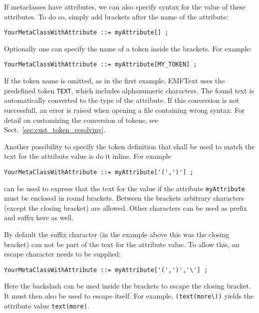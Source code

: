 If metaclasses have attributes, we can also specify syntax for the value of
these attributes. To do so, simply add brackets after the name of the attribute:

\begin{lstlisting}
YourMetaClassWithAttribute ::= myAttribute[] ;
\end{lstlisting}

Optionally one can specify the name of a token inside the brackets. For example:

\begin{lstlisting}
YourMetaClassWithAttribute ::= myAttribute[MY_TOKEN] ;
\end{lstlisting}

If the token name is omitted, as in the first example, EMFText uses the 
predefined token \texttt{TEXT}, which includes alphanumeric characters. The
found text is automatically converted to the type of the attribute. If this 
conversion is not successfull, an error is raised when opening a file containing 
wrong syntax. For detail on customizing the conversion of tokens, see
Sect.~\ref{sec:cust_token_resolving}.

Another possibility to specify the token definition that shall be used to match 
the text for the attribute value is do it inline. For example

\begin{lstlisting}
YourMetaClassWithAttribute ::= myAttribute['(',')'] ;
\end{lstlisting}

can be used to express that the text for the value if the attribute
\texttt{myAttribute} must be enclosed in round brackets. Between the brackets 
arbitrary characters (except the closing 
bracket) are allowed. Other characters can be used as prefix and suffix here as 
well.

By default the suffix character (in the example above this was the closing 
bracket) can not be part of the text for the attribute value. To allow this, 
an escape character needs to be supplied:

\begin{lstlisting}
YourMetaClassWithAttribute ::= myAttribute['(',')','\'] ;
\end{lstlisting}

Here the backslash can be used inside the brackets to escape the closing 
bracket. It must then also be used to escape itself. For example,
\texttt{(text(more\textbackslash{}))} yields the attribute value 
\texttt{text(more)}.

